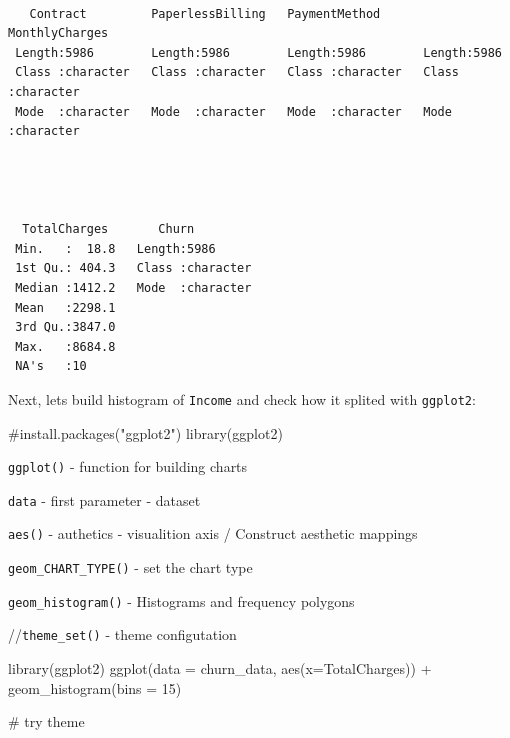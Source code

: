 \documentclass[
  letterpaper,
  DIV=11,
  numbers=noendperiod]{scrreprt}
\newenvironment{Shaded}{\begin{snugshade}}{\end{snugshade}}
\newcommand{\AttributeTok}[1]{\textcolor[rgb]{0.40,0.45,0.13}{#1}}
\newcommand{\CommentTok}[1]{\textcolor[rgb]{0.37,0.37,0.37}{#1}}
\newcommand{\DecValTok}[1]{\textcolor[rgb]{0.68,0.00,0.00}{#1}}
\newcommand{\FunctionTok}[1]{\textcolor[rgb]{0.28,0.35,0.67}{#1}}
\newcommand{\NormalTok}[1]{\textcolor[rgb]{0.00,0.23,0.31}{#1}}
\newcommand{\SpecialCharTok}[1]{\textcolor[rgb]{0.37,0.37,0.37}{#1}}
\begin{document}
\begin{verbatim}
                                                                            
   Contract         PaperlessBilling   PaymentMethod      MonthlyCharges    
 Length:5986        Length:5986        Length:5986        Length:5986       
 Class :character   Class :character   Class :character   Class :character  
 Mode  :character   Mode  :character   Mode  :character   Mode  :character  
                                                                            
                                                                            
                                                                            
                                                                            
  TotalCharges       Churn          
 Min.   :  18.8   Length:5986       
 1st Qu.: 404.3   Class :character  
 Median :1412.2   Mode  :character  
 Mean   :2298.1                     
 3rd Qu.:3847.0                     
 Max.   :8684.8                     
 NA's   :10                         
\end{verbatim}

Next, lets build histogram of \texttt{Income} and check how it splited
with \texttt{ggplot2}:

\begin{Shaded}
\begin{Highlighting}[]
\CommentTok{\#install.packages("ggplot2")}
\FunctionTok{library}\NormalTok{(ggplot2)}
\end{Highlighting}
\end{Shaded}

\texttt{ggplot()} - function for building charts

\texttt{data} - first parameter - dataset

\texttt{aes()} - authetics - visualition axis / Construct aesthetic
mappings

\texttt{geom\_CHART\_TYPE()} - set the chart type

\texttt{geom\_histogram()} - Histograms and frequency polygons

//\texttt{theme\_set()} - theme configutation

\begin{Shaded}
\begin{Highlighting}[]
\FunctionTok{library}\NormalTok{(ggplot2)}
\FunctionTok{ggplot}\NormalTok{(}\AttributeTok{data =}\NormalTok{ churn\_data, }\FunctionTok{aes}\NormalTok{(}\AttributeTok{x=}\NormalTok{TotalCharges)) }\SpecialCharTok{+} \FunctionTok{geom\_histogram}\NormalTok{(}\AttributeTok{bins =} \DecValTok{15}\NormalTok{)}

\CommentTok{\# try theme}
\end{Highlighting}
\end{Shaded}
\end{document}
